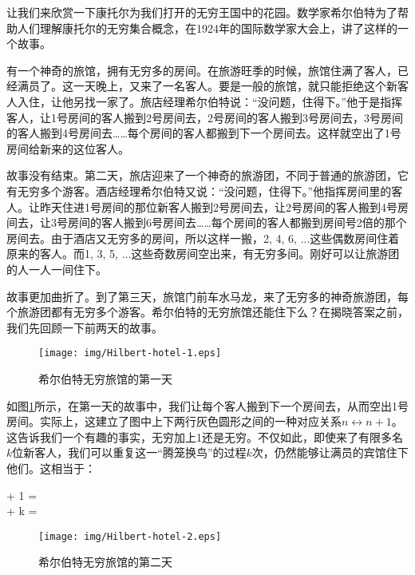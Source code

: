 \documentclass{article}
\begin{document}
让我们来欣赏一下康托尔为我们打开的无穷王国中的花园。数学家希尔伯特为了帮助人们理解康托尔的无穷集合概念，在1924年的国际数学家大会上，讲了这样的一个故事。

有一个神奇的旅馆，拥有无穷多的房间。在旅游旺季的时候，旅馆住满了客人，已经满员了。这一天晚上，又来了一名客人。要是一般的旅馆，就只能拒绝这个新客人入住，让他另找一家了。旅店经理希尔伯特说：“没问题，住得下。”他于是指挥客人，让1号房间的客人搬到2号房间去，2号房间的客人搬到3号房间去，3号房间的客人搬到4号房间去……每个房间的客人都搬到下一个房间去。这样就空出了1号房间给新来的这位客人。

故事没有结束。第二天，旅店迎来了一个神奇的旅游团，不同于普通的旅游团，它有无穷多个游客。酒店经理希尔伯特又说：“没问题，住得下。”他指挥房间里的客人。让昨天住进1号房间的那位新客人搬到2号房间去，让2号房间的客人搬到4号房间去，让3号房间的客人搬到6号房间去……每个房间的客人都搬到房间号2倍的那个房间去。由于酒店又无穷多的房间，所以这样一搬，2, 4, 6, ...这些偶数房间住着原来的客人。而1, 3, 5, ...这些奇数房间空出来，有无穷多间。刚好可以让旅游团的人一人一间住下。

故事更加曲折了。到了第三天，旅馆门前车水马龙，来了无穷多的神奇旅游团，每个旅游团都有无穷多个游客。希尔伯特的无穷旅馆还能住下么？在揭晓答案之前，我们先回顾一下前两天的故事。

\begin{figure}[htbp]
 \centering
 \texttt{[image: img/Hilbert-hotel-1.eps]}
 \caption{希尔伯特无穷旅馆的第一天}
 \label{fig:Hilbert-hotel-1}
\end{figure}

如图\ref{fig:Hilbert-hotel-1}所示，在第一天的故事中，我们让每个客人搬到下一个房间去，从而空出1号房间。实际上，这建立了图中上下两行灰色圆形之间的一种对应关系$n \leftrightarrow n+1$。这告诉我们一个有趣的事实，无穷加上1还是无穷。不仅如此，即使来了有限多名$k$位新客人，我们可以重复这一“腾笼换鸟”的过程$k$次，仍然能够让满员的宾馆住下他们。这相当于：

\bean
\infty + 1 = \infty \\
\infty + k = \infty \\
\eean

\begin{figure}[htbp]
 \centering
 \texttt{[image: img/Hilbert-hotel-2.eps]}
 \caption{希尔伯特无穷旅馆的第二天}
 \label{fig:Hilbert-hotel-2}
\end{figure}
\end{document}
